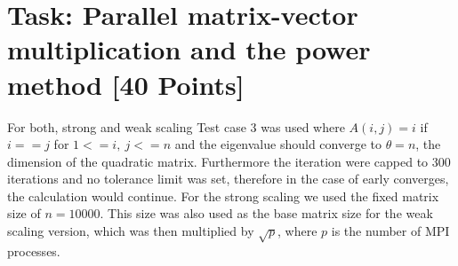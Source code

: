 \section{Task: Parallel matrix-vector multiplication and the power method [40 Points]}
For both, strong and weak scaling Test case 3 was used where
$A(i, j) = i$ if $i == j$ for $1 <= i, \ j <= n$ and the eigenvalue should converge to  $\theta = n$, the dimension of the quadratic matrix.
Furthermore the iteration were capped to 300 iterations and no tolerance limit was set, therefore in the case of early converges, the calculation would continue. For the strong scaling we used the fixed matrix size of $n=10000$. This size was also used as the base matrix size for the weak scaling version, which was then multiplied by $\sqrt{p}$, where $p$ is the number of MPI processes.

